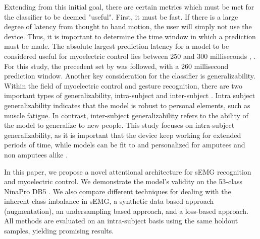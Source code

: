  Extending from this initial goal, there are certain metrics which must be met for the classifier to be deemed "useful". First, it must be fast. If there is a large degree of latency from thought to hand motion, the user will simply not use the device. Thus, it is important to determine the time window in which a prediction must be made. The absolute largest prediction latency for a model to be considered useful for myoelectric control lies between 250 and 300 milliseconds  \cite{300ms}, \cite{250ms}. For this study, the precedent set by \cite{primary} was followed, with a 260 millisecond prediction window.
Another key consideration for the classifier is generalizability. Within the field of myoelectric control and gesture recognition, there are two important types of generalizability, intra-subject and inter-subject \cite{ring_2018}. Intra subject generalizability indicates that the model is robust to personal elements, such as muscle fatigue. In contrast, inter-subject generalizability refers to the ability of the model to generalize to new people. This study focuses on intra-subject generalizability, as it is important that the device keep working for extended periods of time, while models can be fit to and personalized for amputees and non amputees alike \cite{amputeedb}. \par
In this paper, we propose a novel attentional architecture for sEMG recognition and myoelectric control. We demonstrate the model's validity on the 53-class NinaPro DB5 \cite{nina5}. We also compare different techniques  for dealing with the inherent class imbalance in sEMG, a synthetic data based approach (augmentation), an undersampling based approach, and a loss-based approach. All methods are evaluated on an intra-subject basis using the same holdout samples, yielding promising results.








